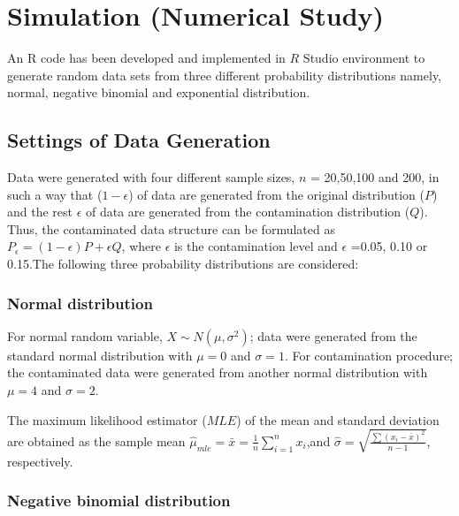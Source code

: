 \documentclass[
]{article}
\begin{document}
\hypertarget{simulation-numerical-study}{%
\section{Simulation (Numerical
Study)}\label{simulation-numerical-study}}

An R code has been developed and implemented in \(R\) Studio environment
to generate random data sets from three different probability
distributions namely, normal, negative binomial and exponential
distribution.

\hypertarget{settings-of-data-generation}{%
\subsection{Settings of Data
Generation}\label{settings-of-data-generation}}

Data were generated with four different sample sizes, \(n\) = 20,50,100
and 200, in such a way that (\(1-\epsilon\)) of data are generated from
the original distribution (\(P\)) and the rest \(\epsilon\) of data are
generated from the contamination distribution (\(Q\)). Thus, the
contaminated data structure can be formulated as
\(P_{\epsilon}=(1-\epsilon)P+\epsilon Q\), where \(\epsilon\) is the
contamination level and \(\epsilon\) =0.05, 0.10 or 0.15.The following
three probability distributions are considered:

\hypertarget{normal-distribution}{%
\subsubsection{Normal distribution}\label{normal-distribution}}

For normal random variable, \(X\sim N(\mu,\sigma^2)\); data were
generated from the standard normal distribution with \(\mu = 0\) and
\(\sigma = 1\). For contamination procedure; the contaminated data were
generated from another normal distribution with \(\mu = 4\) and
\(\sigma = 2\).

The maximum likelihood estimator (\(MLE\)) of the mean and standard
deviation are obtained as the sample mean
\(\hat{\mu}_{mle} = \bar{x} = \frac{1}{n} \sum_{i=1}^n x_i\),and
\(\hat{\sigma} = \sqrt{\frac{\sum (x_{i} - \bar{x})^{2}}{n - 1}}\),
respectively.

\hypertarget{negative-binomial-distribution}{%
\subsubsection{Negative binomial
distribution}\label{negative-binomial-distribution}}
\end{document}
